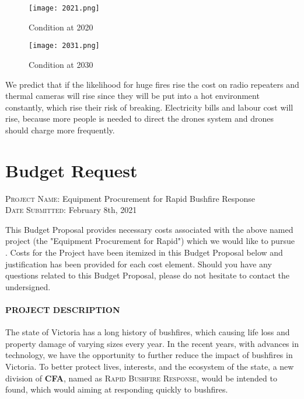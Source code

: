 \documentclass[13pt]{ctexart} %
\begin{document}
\begin {figure}[h]
\centering %
\texttt{[image: 2021.png]}
\caption{Condition at 2020} %
\end {figure}

\begin {figure}[h]
\centering %
\texttt{[image: 2031.png]}
\caption{Condition at 2030} %
\end {figure}

We predict that if the likelihood for huge fires rise the cost on radio repeaters and thermal cameras will rise since they will be put into a hot environment constantly, which rise their risk of breaking. Electricity bills and labour cost will rise, because more people is needed to direct the drones system and drones should charge more frequently.

\newpage
\thispagestyle{empty}
\section*{\centering \textbf{Budget Request}}
\vspace{10pt}
\begin{flushleft}
    {\small
        \noindent \textsc{Project Name}: Equipment Procurement for Rapid Bushfire Response
        \\ \noindent \textsc{Date Submitted}: February 8th, 2021}
\end{flushleft}
\vspace{10pt}
This Budget Proposal provides necessary costs associated with the above named project (the "Equipment Procurement for Rapid") which we would like to pursue . Costs for the Project have been itemized in this Budget Proposal below and justification has been provided for each cost element. Should you have any questions related to this Budget Proposal, please do not hesitate to contact the undersigned.
\paragraph{PROJECT DESCRIPTION\\} The state of Victoria has a long history of bushfires, which causing life loss and property damage of varying sizes every year. In the recent years, with advances in technology, we have the opportunity to further reduce the impact of bushfires in Victoria. To better protect lives, interests, and the ecosystem of the state, a new division of \textbf{CFA}, named as \textsc{Rapid Bushfire Response}, would be intended to found, which would aiming at responding quickly to bushfires.
\end{document}
